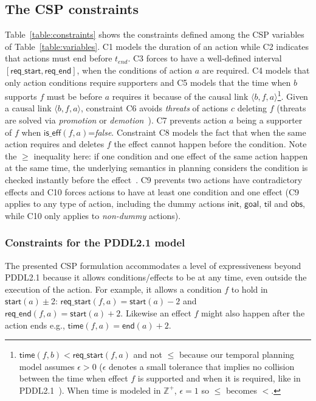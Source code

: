 \documentclass{ecai}
\newcommand{\tup}[1]{{\langle #1 \rangle}}
\newcommand{\iscond}{\mathsf{is\_cond}}    %
\newcommand{\iseff}{\mathsf{is\_eff}}    %
\newcommand{\obs}{\mathsf{obs}}    %
\newcommand{\start}{\mathsf{start}}%
\newcommand{\en}{\mathsf{end}}     %
\newcommand{\til}{\mathsf{til}}    %
\newcommand{\supp}{\mathsf{sup}}   %
\newcommand{\tim}{\mathsf{time}}   %
\newcommand{\reqs}{\mathsf{req\_{start}}} %
\newcommand{\reqe}{\mathsf{req\_{end}}}   %
\newcommand{\ini}{\mathsf{init}}   %
\newcommand{\goal}{\mathsf{goal}}  %
\begin{document}
\subsection{The CSP constraints}
\label{section:CSPconstraints}
Table~\ref{table:constraints} shows the constraints defined among the CSP variables of Table~\ref{table:variables}. C1 models the duration of an action while C2 indicates that actions must end before $t_{end}$. C3 forces to have a well-defined interval $[\reqs,\reqe]$, when the conditions of action $a$ are required. C4 models that only action conditions require supporters and C5 models that the time when $b$ supports $f$ must be before $a$ requires it because of the causal link $\tup{b,f,a}$\footnote{$\tim(f,b) < \reqs(f,a)$ and not $\leq$ because our temporal planning model assumes $\epsilon > 0$ ($\epsilon$ denotes a small tolerance that implies no collision between the time when effect $f$ is supported and when it is required, like in PDDL2.1~\cite{fox2003pddl2}). When time is modeled in $\mathbb{Z}^+$, $\epsilon=1$ so $\leq$ becomes $<$.}. Given a causal link $\tup{b,f,a}$, constraint C6 avoids {\em threats} of actions $c$ deleting $f$ (threats are solved via {\em promotion} or {\em demotion}~\cite{ghallab2004automated}). C7 prevents action $a$ being a supporter of $f$ when $\iseff(f,a)$=\textit{false}. Constraint C8 models the fact that when the same action requires and deletes $f$ the effect cannot happen before the condition. Note the $\geq$ inequality here: if one condition and one effect of the same action happen at the same time, the underlying semantics in planning considers the condition is checked instantly before the effect~\cite{fox2003pddl2}. C9 prevents two actions have contradictory effects and C10 forces actions to have at least one condition and one effect (C9 applies to any type of action, including the dummy actions $\ini$, $\goal$, $\til$ and $\obs$, while C10 only applies to {\em non-dummy} actions).


\subsubsection{Constraints for the PDDL2.1 model}
\label{sec:PDDL21constraints}
The presented CSP formulation accommodates a level of expressiveness beyond PDDL2.1 because it allows conditions/effects to be at any time, even outside the execution of the action. For example, it allows a condition $f$ to hold in $\start(a)\pm$2: $\reqs(f,a)=\start(a)-2$ and $\reqe(f,a)=\start(a)+2$. Likewise an effect $f$ might also happen after the action ends e.g., $\tim(f,a)=\en(a)+2$.
\end{document}
